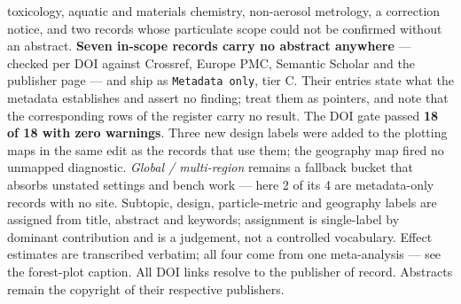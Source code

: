 \documentclass[10pt]{article}
\begin{document}
\begin{keybox}
{toxicology, aquatic and materials chemistry, non-aerosol metrology, a correction notice, and
two records whose particulate scope could not be confirmed without an abstract.
\textbf{Seven in-scope records carry no abstract anywhere} --- checked per DOI against
Crossref, Europe PMC, Semantic Scholar and the publisher page --- and ship as
\texttt{Metadata only}, tier C. Their entries state what the metadata establishes and assert
no finding; treat them as pointers, and note that the corresponding rows of the register
carry no result.
The DOI gate passed \textbf{18 of 18 with zero warnings}. Three new design labels were added
to the plotting maps in the same edit as the records that use them; the geography map fired
no unmapped diagnostic. \textit{Global / multi-region} remains a fallback bucket that absorbs
unstated settings and bench work --- here 2 of its 4 are metadata-only records with no site.
Subtopic, design, particle-metric and geography labels are assigned from title, abstract and
keywords; assignment is single-label by dominant contribution and is a judgement, not a
controlled vocabulary. Effect estimates are transcribed verbatim; all four come from one
meta-analysis --- see the forest-plot caption.
All DOI links resolve to the publisher of record. Abstracts remain the copyright of their
respective publishers.\par}
\end{keybox}
\end{document}
